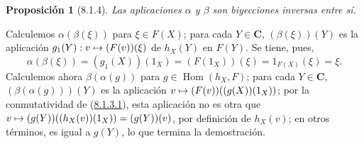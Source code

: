 \documentclass[10pt,oneside,openany]{book}
\makeatletter
\theoremstyle{egaenv}\newtheorem*{env}{---}
\theoremstyle{egastatement}
\newtheorem*{proposition}{Proposición}
\theoremstyle{egadescription}
\let\ega@shortmapsto\mapsto
\renewcommand{\mapsto}{\mathchoice{\longmapsto}{\ega@shortmapsto}{\ega@shortmapsto}{\ega@shortmapsto}}
\makeatother
\begin{document}
\begin{proposition}[8.1.4]
\label{0.8.1.4}
\label{0.8.1.4-fr}
Las aplicaciones $\alpha$ y $\beta$ son biyecciones inversas entre sí.
\end{proposition}


Calculemos $\alpha(\beta(\xi))$ para $\xi\in F(X)$; para cada $Y\in\boldsymbol{C}$, $(\beta(\xi))(Y)$ es la aplicación
$g_1(Y):v\mapsto(F(v))(\xi)$ de $h_X(Y)$ en $F(Y)$. Se tiene, pues,
\[
  \alpha(\beta(\xi))=(g_1(X))(1_X)=(F(1_X))(\xi)
  =1_{F(X)}(\xi)=\xi.
\]
Calculemos ahora $\beta(\alpha(g))$ para $g\in\operatorname{Hom}(h_X,F)$; para cada $Y\in\boldsymbol{C}$, $(\beta(\alpha(g)))(Y)$
es la aplicación $v\mapsto(F(v))((g(X))(1_X))$; por la conmutatividad de (\hyperref[0.8.1.3.1]{8.1.3.1}), esta aplicación
no es otra que $v\mapsto(g(Y))((h_X(v))(1_X))=(g(Y))(v)$, por definición de $h_X(v)$; en otros términos,
es igual a $g(Y)$, lo que termina la demostración.
\end{document}
